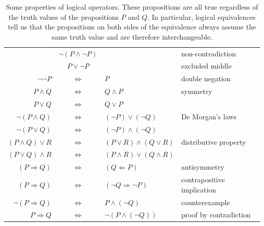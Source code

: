 \begin{table}
\begin{tabular}{rcll}
                                                    &$\neg (P \land \neg P)$&
                          & non-contradiction \\
                                                  &$P \lor \neg P$&
                         & excluded middle \\
                                                  $\neg \neg P$ & $\iff$ & $ P$
                         & double negation\\
                                                                        $P \land
                                    Q$ & $\iff$ & $ Q \land P$
                                    & symmetry\\
                                                                          $P
                                     \lor Q$ & $\iff$ & $ Q \lor P$
                                     & \\
                                                            $\neg (P\land Q)$ &
                              $\iff$ & $ (\neg P) \lor (\neg Q)$      & De
                              Morgan's laws\\
                                                              $\neg (P\lor Q)$ &
                               $\iff$ & $ (\neg P) \land (\neg Q)$     & \\
                                                        $(P\land Q) \lor R$ &
                            $\iff$ & $ (P\lor R) \land (Q \lor R)$  &
                            distributive property\\
                                                        $(P\lor Q) \land R$ &
                            $\iff$ & $ (P\land R) \lor (Q \land R)$ & \\
                                                        $(P \Rightarrow Q)$ &
                            $\iff$ & $ (Q \Leftarrow P)$            &
                            antisymmetry\\
                                                        $(P\Rightarrow Q)$ &
                            $\iff$ & $ (\neg Q\Rightarrow\neg P)$   &
                            contrapositive implication\\
                                                $\neg (P\Rightarrow Q)$ & $\iff$
                        & $ P \land (\neg Q)$            & counterexample\\
                                                          $P\Rightarrow Q$ &
                             $\iff$ & $ \lnot(P \land (\neg Q))$     & proof by
                             contradiction
\end{tabular}
\caption{Some properties of logical operators. These propositions are all true regardless of the truth values of the propositions $P$ and $Q$. In particular, logical equivalences tell us that the propositions on both sides of the equivalence always assume the same truth value and are therefore interchangeable.}
\label{tab:operatori_logici}
\end{table}


